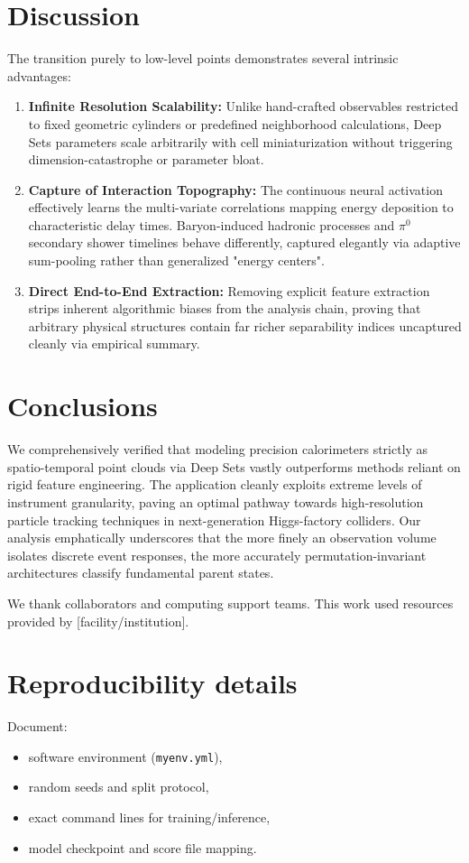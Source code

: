 \documentclass[11pt,a4paper]{article}
\newcommand{\deepset}{Deep Sets\xspace}
\begin{document}
\section{Discussion}
\label{sec:discussion}
The transition purely to low-level points demonstrates several intrinsic advantages:
\begin{enumerate}
    \item \textbf{Infinite Resolution Scalability:} Unlike hand-crafted observables restricted to fixed geometric cylinders or predefined neighborhood calculations, \deepset parameters scale arbitrarily with cell miniaturization without triggering dimension-catastrophe or parameter bloat.
    \item \textbf{Capture of Interaction Topography:} The continuous neural activation effectively learns the multi-variate correlations mapping energy deposition to characteristic delay times. Baryon-induced hadronic processes and $\pi^0$ secondary shower timelines behave differently, captured elegantly via adaptive sum-pooling rather than generalized "energy centers".
    \item \textbf{Direct End-to-End Extraction:} Removing explicit feature extraction strips inherent algorithmic biases from the analysis chain, proving that arbitrary physical structures contain far richer separability indices uncaptured cleanly via empirical summary.
\end{enumerate}

\section{Conclusions}
\label{sec:conclusion}
We comprehensively verified that modeling precision calorimeters strictly as spatio-temporal point clouds via Deep Sets vastly outperforms methods reliant on rigid feature engineering. The application cleanly exploits extreme levels of instrument granularity, paving an optimal pathway towards high-resolution particle tracking techniques in next-generation Higgs-factory colliders. Our analysis emphatically underscores that the more finely an observation volume isolates discrete event responses, the more accurately permutation-invariant architectures classify fundamental parent states.


\acknowledgments
We thank collaborators and computing support teams. This work used resources provided by [facility/institution].

\appendix

\section{Reproducibility details}
\label{app:repro}
Document:
\begin{itemize}
    \item software environment (\texttt{myenv.yml}),
    \item random seeds and split protocol,
    \item exact command lines for training/inference,
    \item model checkpoint and score file mapping.
\end{itemize}



\end{document}
